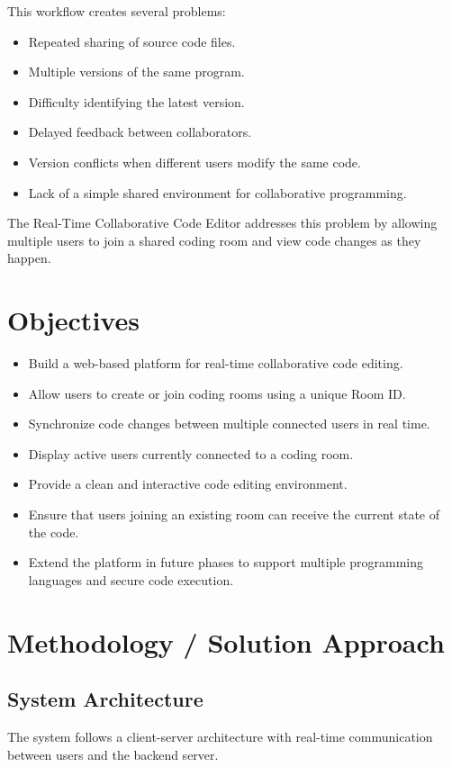 \documentclass[11pt,letterpaper]{article}
\begin{document}
This workflow creates several problems:
\begin{itemize}
\item Repeated sharing of source code files.
\item Multiple versions of the same program.
\item Difficulty identifying the latest version.
\item Delayed feedback between collaborators.
\item Version conflicts when different users modify the same code.
\item Lack of a simple shared environment for collaborative programming.
\end{itemize}

The Real-Time Collaborative Code Editor addresses this problem by allowing multiple users to join a shared coding room and view code changes as they happen.

\section{Objectives}
\begin{itemize}
\item Build a web-based platform for real-time collaborative code editing.
\item Allow users to create or join coding rooms using a unique Room ID.
\item Synchronize code changes between multiple connected users in real time.
\item Display active users currently connected to a coding room.
\item Provide a clean and interactive code editing environment.
\item Ensure that users joining an existing room can receive the current state of the code.
\item Extend the platform in future phases to support multiple programming languages and secure code execution.
\end{itemize}
\section{Methodology / Solution Approach}
\subsection{System Architecture}
The system follows a client-server architecture with real-time communication between users and the backend server.
\end{document}

